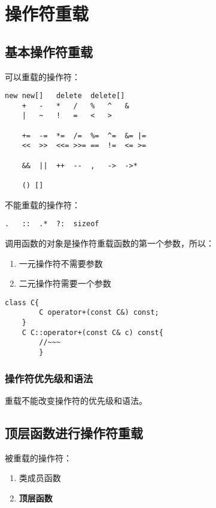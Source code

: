 \chapter{操作符重载}
\newpage

\section{基本操作符重载}

可以重载的操作符：
\begin{lstlisting}[frame=shadowbox]
    new new[]   delete  delete[]
    +   -   *   /   %   ^   &
    |   ~   !   =   <   > 

    +=  -=  *=  /=  %=  ^=  &= |=
    <<  >>  <<= >>= ==  !=  <= >=

    &&  ||  ++  --  ,   ->  ->*

    () []
\end{lstlisting}

不能重载的操作符：
\begin{lstlisting}[frame=shadowbox]
    .   ::  .*  ?:  sizeof    
\end{lstlisting}

调用函数的对象是操作符重载函数的第一个参数，所以：
\begin{enumerate}
    \item 一元操作符不需要参数
    \item 二元操作符需要一个参数
\end{enumerate}

\begin{lstlisting}[frame=shadowbox]
    class C{
        C operator+(const C&) const;
    }
    C C::operator+(const C& c) const{
        //~~~
        }
\end{lstlisting}

\subsection{操作符优先级和语法}

重载不能改变操作符的优先级和语法。

\section{顶层函数进行操作符重载}

被重载的操作符：
\begin{enumerate}
    \item 类成员函数
    \item \textbf{顶层函数}
\end{enumerate}



\newpage